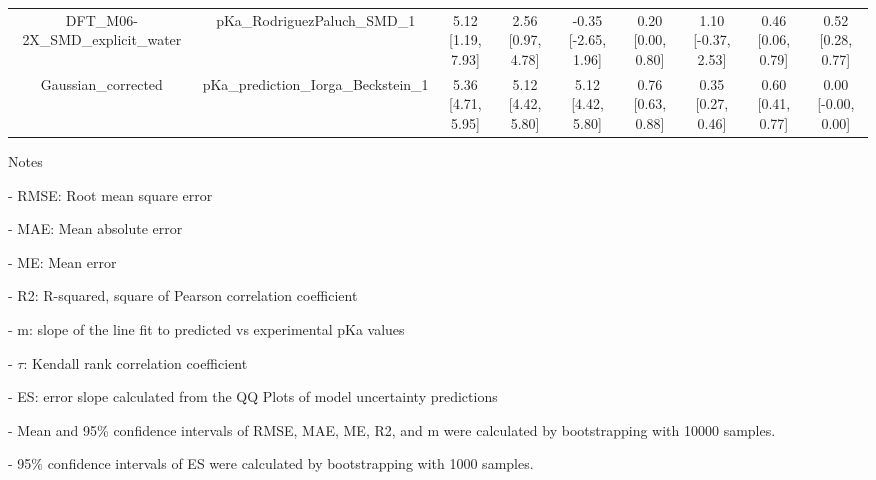 \documentclass{article}
\begin{document}
\begin{center}
\begin{longtable}{|ccccccccc|}
 DFT_M06-2X_SMD_explicit_water &          pKa\_RodriguezPaluch\_SMD\_1 &  5.12 [1.19, 7.93] &  2.56 [0.97, 4.78] &  -0.35 [-2.65, 1.96] &  0.20 [0.00, 0.80] &    1.10 [-0.37, 2.53] &     0.46 [0.06, 0.79] &     0.52 [0.28, 0.77] \\
            Gaussian_corrected &  pKa\_prediction\_Iorga\_Beckstein\_1 &  5.36 [4.71, 5.95] &  5.12 [4.42, 5.80] &    5.12 [4.42, 5.80] &  0.76 [0.63, 0.88] &     0.35 [0.27, 0.46] &     0.60 [0.41, 0.77] &    0.00 [-0.00, 0.00] \\
\end{longtable}
\end{center}

Notes

- RMSE: Root mean square error

- MAE: Mean absolute error

- ME: Mean error

- R2: R-squared, square of Pearson correlation coefficient

- m: slope of the line fit to predicted vs experimental pKa values

- $\tau$:  Kendall rank correlation coefficient

- ES: error slope calculated from the QQ Plots of model uncertainty predictions

- Mean and 95\% confidence intervals of RMSE, MAE, ME, R2, and m were calculated by bootstrapping with 10000 samples.

- 95\% confidence intervals of ES were calculated by bootstrapping with 1000 samples.\end{document}
\end{document}
